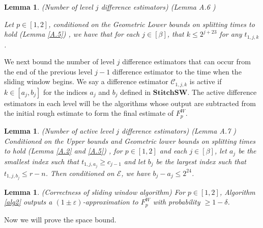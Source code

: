 \documentclass{article}
\theoremstyle{plain}
\newtheorem{lem}[theorem]{Lemma}
\begin{document}
\begin{lem}\label{A.6}(Number of level $j$ difference estimators) (Lemma A.6 \cite{woodruff2022tight})

Let $p \in[1,2]$, conditioned on the Geometric Lower bounds on splitting times to hold (Lemma \ref {A.5}) , we have that for each $j \in[\beta]$, that $k \leq 2^{j+23}$ for any $t_{1, j, k}$.

\end{lem}








We next bound the number of level $j$ difference estimators that can occur from the end of the previous level $j-1$ difference estimator to the time when the sliding window begins. We say a difference estimator $\mathcal{C}_{1, j, k}$ is active if $k \in\left[a_j, b_j\right]$ for the indices $a_j$ and $b_j$ defined in $\textbf{StitchSW}$. The active difference estimators in each level will be the algorithms whose output are subtracted from the initial rough estimate to form the final estimate of $F_p ^ W$.


\begin{lem}\label{A.7}(Number of active level $j$ difference estimators) (Lemma A.7 \cite{woodruff2022tight}) Conditioned on the Upper bounds and Geometric lower bounds on splitting times to hold (Lemma \ref{A.2} and \ref{A.5}) , for $p \in[1,2]$ and each $j \in[\beta]$, let $a_j$ be the smallest index such that $t_{1, j, a_j} \geq c_{j-1}$ and let $b_j$ be the largest index such that $t_{1, j, b_j} \leq r - n$. Then conditioned on $\mathcal{E}$, we have $b_j-a_j \leq 2 ^ {24}$.

\end{lem}


\begin{lem}\label{A.8}(Correctness of sliding window algorithm) For $p \in[1,2]$, Algorithm \ref{alg2} outputs a $(1\pm \varepsilon)$-approximation to $F_p ^ W$ with probability $\ge 1 - \delta$.
\end{lem}












Now we will prove the space bound. 
\end{document}
